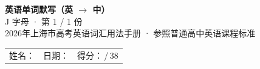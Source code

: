 \documentclass[10pt,a4paper]{article}
\begin{document}
\pagestyle{plain}

\begin{center}
{\LARGE\bfseries 英语单词默写（英 $\to$ 中）}\\[0.22em]
{\large J 字母 · 第 1 / 1 份}\\[0.18em]
{\small 2026年上海市高考英语词汇用法手册 · 参照普通高中英语课程标准}
\end{center}

\vspace{0.25em}
\noindent\begin{tabular}{@{}p{}@{}p{}@{}p{}@{}}
姓名：\underline{\hspace{2.0cm}} & 日期：\underline{\hspace{2.0cm}} & 得分：\underline{\hspace{1.3cm}}\,/\,38 \\
\end{tabular}

\vspace{0.3em}

\vspace{0.08em}
\end{document}
